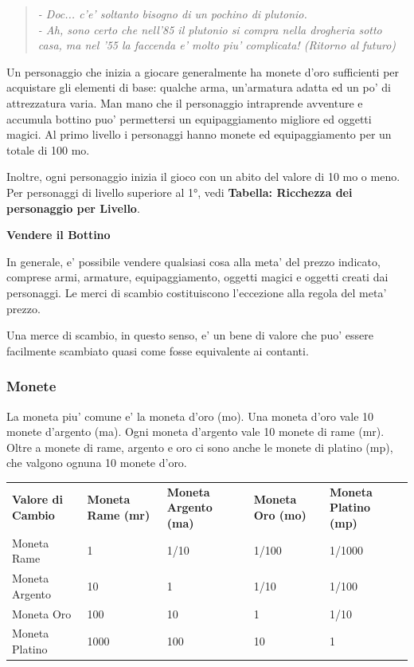 \documentclass[a4paper,11pt,twoside,openany]{book}
\begin{document}
{		
		\begin{quote}\textit{
				- Doc... c'e' soltanto bisogno di un pochino di plutonio.\\
				- Ah, sono certo che nell'85 il plutonio si compra nella drogheria sotto casa, ma nel '55 la faccenda e' molto piu' complicata! (Ritorno al futuro)
		}\end{quote}
		
		
		\label{ricchezza-e-denaro}
		
		Un personaggio che inizia a giocare generalmente ha monete d'oro sufficienti per acquistare gli elementi di base: qualche arma, un'armatura adatta ed un po' di attrezzatura varia. Man mano che il personaggio intraprende avventure e accumula bottino puo' permettersi un equipaggiamento migliore ed oggetti magici. Al primo livello i personaggi hanno monete ed equipaggiamento per un totale di 100 mo.
		
		Inoltre, ogni personaggio inizia il gioco con un abito del valore di 10 mo o meno. Per personaggi di livello superiore al 1°, vedi \textbf{Tabella: Ricchezza dei personaggio per Livello}.
		
		\textbf{Vendere il Bottino}
		
		In generale, e' possibile vendere qualsiasi cosa alla meta' del prezzo indicato, comprese armi, armature, equipaggiamento, oggetti magici e oggetti creati dai personaggi. Le merci di scambio costituiscono l'eccezione alla regola del meta' prezzo.
		
		Una merce di scambio, in questo senso, e' un bene di valore che puo' essere facilmente scambiato quasi come fosse equivalente ai contanti.
		
		\bigskip
		
		\subsubsection{Monete}
		
		La moneta piu' comune e' la moneta d'oro (mo). Una moneta d'oro vale 10 monete d'argento (ma). Ogni moneta d'argento vale 10 monete di rame (mr). Oltre a monete di rame, argento e oro ci sono anche le monete di platino (mp), che valgono ognuna 10 monete d'oro.
		
		\begin{tabular}{L{3cm} L{3cm} L{3cm} L{3cm} L{3cm}}
			\toprule
			\textbf{Valore di Cambio} & \textbf{Moneta Rame (mr)} & \textbf{Moneta Argento (ma)} & \textbf{Moneta Oro (mo)} & \textbf{Moneta Platino (mp)}\tabularnewline
			Moneta Rame & 1 & 1/10 & 1/100 & 1/1000\tabularnewline
			Moneta Argento & 10 & 1 & 1/10 & 1/100\tabularnewline
			Moneta Oro & 100 & 10 & 1 & 1/10\tabularnewline
			Moneta Platino & 1000 & 100 & 10 & 1\tabularnewline
		\end{tabular}
		
}
\end{document}
